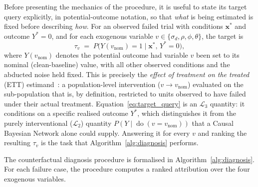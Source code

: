 \documentclass[11pt,a4paper]{report}
\newcommand{\doop}{\operatorname{do}}
\begin{document}
Before presenting the mechanics of the procedure, it is useful to state its target query explicitly, in potential-outcome notation, so that \emph{what} is being estimated is fixed before describing \emph{how}. For an observed failed trial with conditions $\mathbf{x}^*$ and outcome $Y^* = 0$, and for each exogenous variable $v \in \{\sigma_d, \rho, \phi, \theta\}$, the target is
\begin{equation}
  \tau_v \;=\; P\big(Y(v_{\text{nom}}) = 1 \;\big|\; \mathbf{x}^*, \, Y^* = 0\big),
  \label{eq:target_query}
\end{equation}
where $Y(v_{\text{nom}})$ denotes the potential outcome had variable $v$ been set to its nominal (clean-baseline) value, with all other observed conditions and the abducted noise held fixed. This is precisely the \emph{effect of treatment on the treated} (ETT) estimand~\cite{yang2025hierarchy}: a population-level intervention ($v \to v_{\text{nom}}$) evaluated on the sub-population that is, by definition, restricted to units observed to have failed under their actual treatment. Equation~\eqref{eq:target_query} is an $\mathcal{L}_3$ quantity: it conditions on a specific realised outcome $Y^*$, which distinguishes it from the purely interventional ($\mathcal{L}_2$) quantity $P(Y \mid \doop(v = v_{\text{nom}}))$ that a Causal Bayesian Network alone could supply. Answering it for every $v$ and ranking the resulting $\tau_v$ is the task that Algorithm~\ref{alg:diagnosis} performs.

The counterfactual diagnosis procedure is formalised in Algorithm~\ref{alg:diagnosis}. For each failure case, the procedure computes a ranked attribution over the four exogenous variables.
\end{document}
